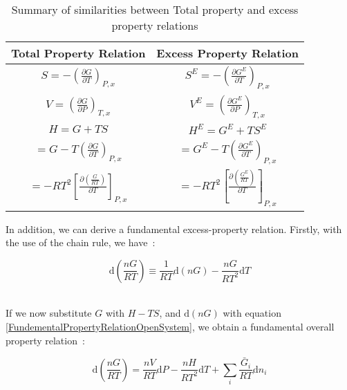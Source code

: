 \begin{table}
			\caption{Summary of similarities between Total property and excess property relations}\label{ExcessPropertyTable}
			\begin{center}
			\begin{tabularx}{\textwidth}{X|X}
			\hline
			\textbf{Total Property Relation}&\textbf{Excess Property Relation}\\
			\hline
			\multicolumn{1}{c|}{$ S = -\left(\frac{\partial G}{\partial T}\right)_{P,x} $}&\multicolumn{1}{c}{$ S^{E} = -\left(\frac{\partial G^{E}}{\partial T}\right)_{P,x} $}\\
			\hline
			\multicolumn{1}{c|}{$V = \left(\frac{\partial G}{\partial P}\right)_{T,x} $}&\multicolumn{1}{c}{$V^{E} = \left(\frac{\partial G^{E}}{\partial P}\right)_{T,x} $}\\
			\hline
			\multicolumn{1}{c|}{$H  = G + TS$}&\multicolumn{1}{c}{$H^{E}  = G^{E} + TS^{E}$}\\
			\multicolumn{1}{c|}{$ = G - T\left(\frac{\partial G}{\partial T}\right)_{P,x}$}&\multicolumn{1}{c}{$ = G^{E} - T\left(\frac{\partial G^{E}}{\partial T}\right)_{P,x}$}\\
			\multicolumn{1}{c|}{$ = -RT^{2}\left[ \frac{\partial\left(\frac{G}{RT}\right)}{\partial T}\right]_{P,x}$}&\multicolumn{1}{c}{$ = -RT^{2}\left[ \frac{\partial\left(\frac{G^{E}}{RT}\right)}{\partial T}\right]_{P,x}$}\\
			\hline			
			\end{tabularx}
			\end{center}
\end{table}
			
In addition, we can derive a fundamental excess-property relation. Firstly, with the use of the chain rule, we have~\cite{SmithNessAbbott}:\

\begin{equation}
\mathrm{d}\left(\frac{nG}{RT}\right) \equiv \frac{1}{RT}\mathrm{d}\left(nG\right) - \frac{nG}{RT^{2}} \mathrm{d}T \label{ChainRule}
\end{equation}\

If we now substitute $G$ with $H - TS$, and $\mathrm{d}\left(nG\right)$ with equation \ref{FundementalPropertyRelationOpenSystem}, we obtain a fundamental overall property relation~\cite{SmithNessAbbott}:\

\begin{equation}
\mathrm{d}\left(\frac{nG}{RT}\right) = \frac{nV}{RT}\mathrm{d}P - \frac{nH}{RT^{2}}\mathrm{d}T  + \sum_{i}\frac{\bar{G}_{i}}{RT}\mathrm{d}n_{i} \label{FundementalPropertyRelation}
\end{equation}\

